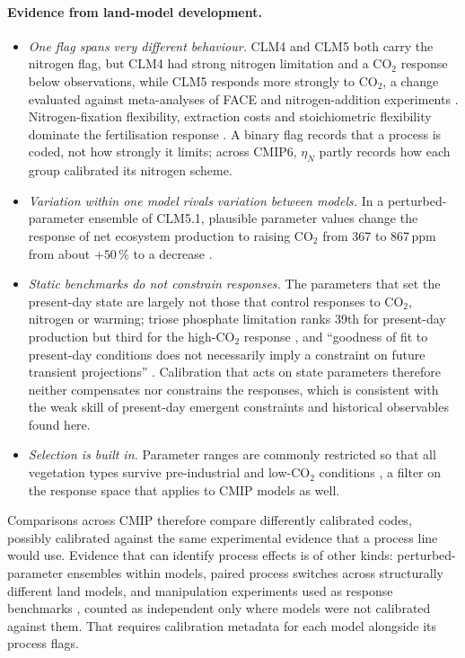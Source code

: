 \documentclass[11pt,a4paper]{article}
\newcommand{\etaN}{$\eta_N$}
\begin{document}
\paragraph{Evidence from land-model development.}
\begin{itemize}
\item \emph{One flag spans very different behaviour.} CLM4 and CLM5 both carry the nitrogen flag, but CLM4 had strong nitrogen limitation and a CO$_2$ response below observations, while CLM5 responds more strongly to CO$_2$, a change evaluated against meta-analyses of FACE and nitrogen-addition experiments \citep{wieder2019}. Nitrogen-fixation flexibility, extraction costs and stoichiometric flexibility dominate the fertilisation response \citep{fisher2019}. A binary flag records that a process is coded, not how strongly it limits; across CMIP6, \etaN{} partly records how each group calibrated its nitrogen scheme.
\item \emph{Variation within one model rivals variation between models.} In a perturbed-parameter ensemble of CLM5.1, plausible parameter values change the response of net ecosystem production to raising CO$_2$ from 367 to 867\,ppm from about $+50$\,\% to a decrease \citep{kennedy2025}.
\item \emph{Static benchmarks do not constrain responses.} The parameters that set the present-day state are largely not those that control responses to CO$_2$, nitrogen or warming; triose phosphate limitation ranks 39th for present-day production but third for the high-CO$_2$ response \citep{kennedy2025}, and ``goodness of fit to present-day conditions does not necessarily imply a constraint on future transient projections'' \citep{fisher2019}. Calibration that acts on state parameters therefore neither compensates nor constrains the responses, which is consistent with the weak skill of present-day emergent constraints and historical observables found here.
\item \emph{Selection is built in.} Parameter ranges are commonly restricted so that all vegetation types survive pre-industrial and low-CO$_2$ conditions \citep{kennedy2025}, a filter on the response space that applies to CMIP models as well.
\end{itemize}

Comparisons across CMIP therefore compare differently calibrated codes, possibly calibrated against the same experimental evidence that a process line would use. Evidence that can identify process effects is of other kinds: perturbed-parameter ensembles within models, paired process switches across structurally different land models, and manipulation experiments used as response benchmarks \citep{wieder2019}, counted as independent only where models were not calibrated against them. That requires calibration metadata for each model alongside its process flags.
\end{document}
